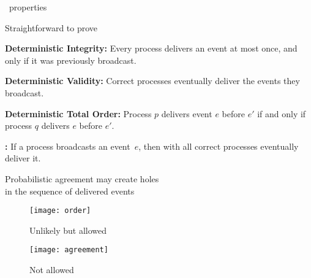 \begin{frame}{\EPTO\ properties}
{

Straightforward to prove
\vspace{-2mm}
\begin{mdframed}[linecolor=black]

 \hangindent=10pt \textbf{Deterministic Integrity:} 
Every process delivers an event at most once, and only if it was previously broadcast. \medskip
  
\hangindent=10pt \textbf{Deterministic Validity:} Correct processes eventually deliver the events they broadcast. \medskip

   \hangindent=10pt \textbf{Deterministic Total Order:} Process $p$ delivers event $e$ before $e'$ if and only if process $q$ delivers $e$ before $e'$. 
\end{mdframed}

\vspace{5mm}

\vspace{-2mm}
 \begin{mdframed}[linecolor=blue]
    \hangindent=10pt \textbf{:} If a process broadcasts an event~$e$, then with  all correct processes eventually deliver it.
  \end{mdframed}
}  

\end{frame}


\begin{frame}{Probabilistic agreement may create holes \\ in the sequence of delivered events}

  \begin{figure}
    \centering
    \texttt{[image: order]}
    \caption*{Unlikely but allowed}
  \end{figure}
   

  \begin{figure}
    \centering
    \texttt{[image: agreement]}
    \caption*{Not allowed}
  \end{figure}

\end{frame}


\subtitle[Balls-into-bins]{Balls-into-bins}


